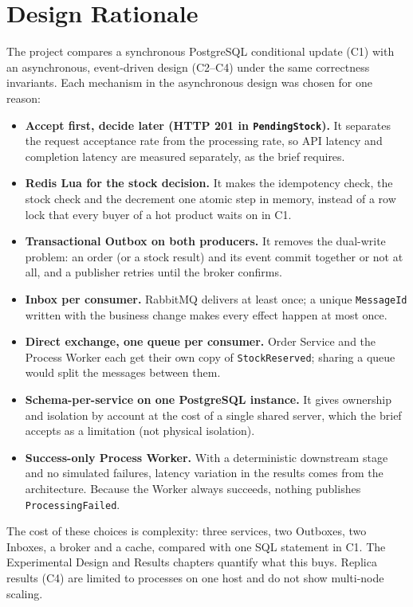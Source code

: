 \documentclass[a4paper]{report}
\begin{document}
\section{Design Rationale}
The project compares a synchronous PostgreSQL conditional update (C1) with an
asynchronous, event-driven design (C2--C4) under the same correctness
invariants. Each mechanism in the asynchronous design was chosen for one
reason:

\begin{itemize}
  \item \textbf{Accept first, decide later (HTTP 201 in \texttt{PendingStock}).}
    It separates the request acceptance rate from the processing rate, so API
    latency and completion latency are measured separately, as the brief
    requires.
  \item \textbf{Redis Lua for the stock decision.} It makes the idempotency
    check, the stock check and the decrement one atomic step in memory,
    instead of a row lock that every buyer of a hot product waits on in C1.
  \item \textbf{Transactional Outbox on both producers.} It removes the
    dual-write problem: an order (or a stock result) and its event commit
    together or not at all, and a publisher retries until the broker confirms.
  \item \textbf{Inbox per consumer.} RabbitMQ delivers at least once; a unique
    \texttt{MessageId} written with the business change makes every effect
    happen at most once.
  \item \textbf{Direct exchange, one queue per consumer.} Order Service and the
    Process Worker each get their own copy of \texttt{StockReserved}; sharing a
    queue would split the messages between them.
  \item \textbf{Schema-per-service on one PostgreSQL instance.} It gives
    ownership and isolation by account at the cost of a single shared server,
    which the brief accepts as a limitation (not physical isolation).
  \item \textbf{Success-only Process Worker.} With a deterministic downstream
    stage and no simulated failures, latency variation in the results comes
    from the architecture. Because the Worker always succeeds, nothing
    publishes \texttt{ProcessingFailed}.
\end{itemize}

The cost of these choices is complexity: three services, two Outboxes, two
Inboxes, a broker and a cache, compared with one SQL statement in C1. The
Experimental Design and Results chapters quantify what this buys. Replica
results (C4) are limited to processes on one host and do not show multi-node
scaling.
\end{document}
